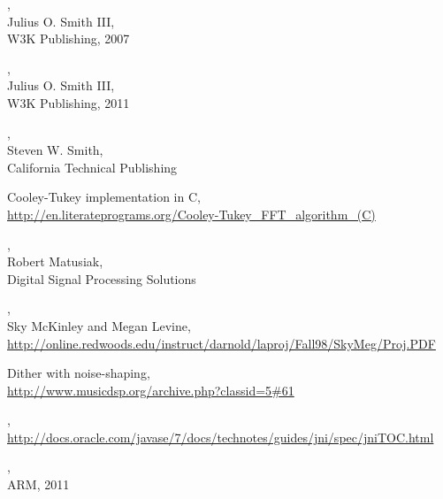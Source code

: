 \documentclass[%
    compressed,
    titlepage,
    narroweqnarray,
    inline,
    twoside,
    ]{ieee}
\begin{document}





\newpage

\begin{thebibliography}{1}

,\\
Julius O. Smith III,\\
W3K Publishing, 2007

,\\
Julius O. Smith III,\\
W3K Publishing, 2011

,\\
Steven W. Smith,\\
California Technical Publishing

Cooley-Tukey implementation in C,\\
\url{http://en.literateprograms.org/Cooley-Tukey_FFT_algorithm_(C)}

,\\
Robert Matusiak,\\
Digital Signal Processing Solutions

,\\
Sky McKinley and Megan Levine,\\
\url{http://online.redwoods.edu/instruct/darnold/laproj/Fall98/SkyMeg/Proj.PDF}

Dither with noise-shaping,\\
\url{http://www.musicdsp.org/archive.php?classid=5#61}

,\\
\url{http://docs.oracle.com/javase/7/docs/technotes/guides/jni/spec/jniTOC.html}

,\\
\textsc{ARM}, 2011

\end{thebibliography}
\end{document}

